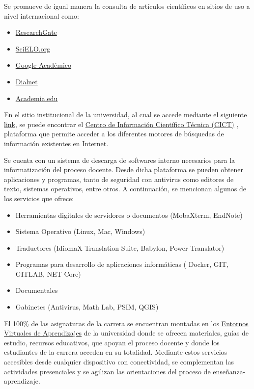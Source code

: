 Se promueve de igual manera la consulta de artículos científicos en sitios de uso a nivel internacional como:

\begin{itemize}
	\setlength\itemsep{-0.5em}
	\item \href{https://www.researchgate.net}{ResearchGate}
	\item \href{https://www.scielo.org/es}{SciELO.org}
	\item \href{https://scholar.google.com/}{Google Académico}
	\item \href{https://dialnet.unirioja.es}{Dialnet}
	\item \href{https://www.academia.edu}{Academia.edu}
\end{itemize}

En el sitio institucional de la universidad, al cual se accede mediante el siguiente \href{https://www.umcc.cu/}{link}, se puede encontrar el \href{http://cict.umcc.cu/}{Centro de Información Científico Técnica (CICT)} , plataforma que permite acceder a los diferentes motores de búsquedas de información existentes en Internet.

Se cuenta con un sistema de descarga de softwares interno necesarios para la informatización del proceso docente. Desde dicha plataforma se pueden obtener aplicaciones y programas, tanto de seguridad con antivirus como editores de texto, sistemas operativos, entre otros. A continuación, se mencionan algunos de los servicios que ofrece:

\begin{itemize}
	\setlength\itemsep{-0.5em}
	\item Herramientas digitales de servidores o documentos (MobaXterm, EndNote)
	\item Sistema Operativo (Linux, Mac, Windows)
	\item Traductores (IdiomaX Translation Suite, Babylon, Power Translator)
	\item Programas para desarrollo de aplicaciones informáticas ( Docker, GIT, GITLAB, NET Core)
	\item Documentales
	\item Gabinetes (Antivirus, Math Lab, PSIM, QGIS) 
\end{itemize}

El 100\% de las asignaturas de la carrera se encuentran montadas en los \href{https://eva.umcc.cu/}{Entornos Virtuales de Aprendizajes} de la universidad donde se ofrecen materiales, guías de estudio, recursos educativos, que apoyan el proceso docente y donde los estudiantes de la carrera acceden en su totalidad. Mediante estos servicios accesibles desde cualquier dispositivo con conectividad, se complementan las actividades presenciales y se agilizan las orientaciones del proceso de enseñanza-aprendizaje.